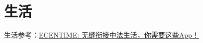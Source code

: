 \section{生活}

生活参考：\href{https://www.ecentime.com/article/liste-app}{ECENTIME: 无缝衔接中法生活，你需要这些App！}





















